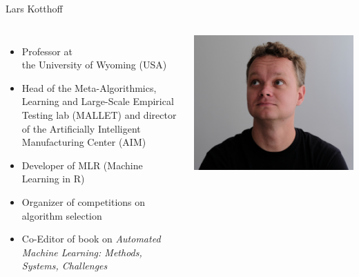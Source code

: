 \begin{frame}[c]{Lars Kotthoff}

\begin{columns}
	
	
	\begin{itemize}
		\item Professor at\\ the University of Wyoming (USA)
        \item Head of the Meta-Algorithmics, Learning and Large-Scale Empirical Testing lab
            (MALLET) and director of the Artificially Intelligent Manufacturing
            Center (AIM)
		\item Developer of MLR (Machine Learning in R)
		\item Organizer of competitions on algorithm selection
    	\item Co-Editor of book on \textit{Automated Machine Learning:	Methods, Systems, Challenges}
	\end{itemize}
	
	
	\includegraphics[width=1.0\textwidth]{images/kotthoff.jpg}
	
\end{columns}

\end{frame}
